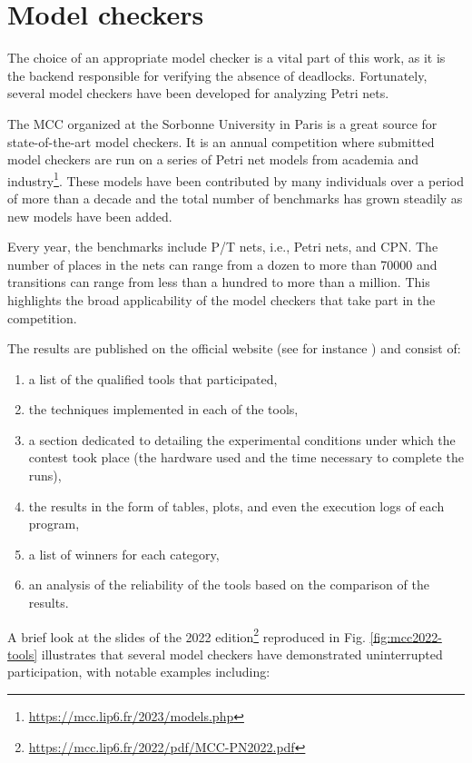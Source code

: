 \section{Model checkers}

The choice of an appropriate model checker is a vital part of this work,
as it is the backend responsible for verifying the absence of deadlocks.
Fortunately, several model checkers have been developed for analyzing Petri nets.

The \acrfull{MCC} \cite{khhjp2021} organized at the Sorbonne University in Paris
is a great source for state-of-the-art model checkers.
It is an annual competition where submitted model checkers are run on a series of
Petri net models from academia and industry\footnote{\url{https://mcc.lip6.fr/2023/models.php}}.
These models have been contributed by many individuals over a period of more than a decade
and the total number of benchmarks has grown steadily as new models have been added.

Every year, the benchmarks include \acrfull{P/T nets}, i.e., Petri nets, and \acrfull{CPN}.
The number of places in the nets can range from a dozen to more than 70000 and transitions
can range from less than a hundred to more than a million.
This highlights the broad applicability of the model checkers that take part in the competition.

The results are published on the official website (see for instance \cite{mcc:2022}) and consist of:

\begin{enumerate}
      \item a list of the qualified tools that participated,
      \item the techniques implemented in each of the tools,
      \item a section dedicated to detailing the experimental conditions under which the contest took place
            (the hardware used and the time necessary to complete the runs),
      \item the results in the form of tables, plots, and even the execution logs of each program,
      \item a list of winners for each category,
      \item an analysis of the reliability of the tools based on the comparison of the results.
\end{enumerate}

A brief look at the slides of the 2022 edition\footnote{\url{https://mcc.lip6.fr/2022/pdf/MCC-PN2022.pdf}}
reproduced in Fig. \ref{fig:mcc2022-tools} illustrates
that several model checkers have demonstrated uninterrupted participation,
with notable examples including:

